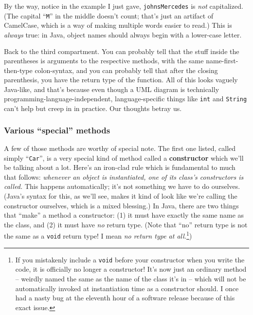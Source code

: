 By the way, notice in the example I just gave, \texttt{johnsMercedes} is
\textit{not} capitalized. (The capital ``\texttt{M}'' in the middle doesn't
count; that's just an artifact of CamelCase, which is a way of making multiple
words easier to read.) This is \textit{always} true: in Java, object names
should always begin with a lower-case letter.

Back to the third compartment. You can probably tell that the stuff inside the
parentheses is arguments to the respective methods, with the same
name-first-then-type colon-syntax, and you can probably tell that after the
closing parenthesis, you have the return type of the function. All of this
looks vaguely Java-like, and that's because even though a UML diagram is
technically programming-language-independent, language-specific things like
\texttt{int} and \texttt{String} can't help but creep in in practice. Our
thoughts betray us.

\subsubsection{Various ``special'' methods}
\label{page:instantiateConstructor}

A few of those methods are worthy of special note. The first one listed,
called simply ``\texttt{Car}'', is a very special kind of method called a
\textbf{constructor} which we'll be talking about a lot. Here's an iron-clad
rule which is fundamental to much that follows: \textit{whenever an object is
instantiated, one of its class's constructors is called.} This happens
automatically; it's not something we have to do ourselves. (Java's syntax for
this, as we'll see, makes it kind of look like we're calling the constructor
ourselves, which is a mixed blessing.) In Java, there are two things that
``make'' a method a constructor: (1) it must have exactly the same name as the
class, and (2) it must have \textit{no} return type. (Note that ``no'' return
type is not the same as a \texttt{void} return type! I mean \textit{no return
type at all.}\footnote{If you mistakenly include a \texttt{void} before your
constructor when you write the code, it is officially no longer a constructor!
It's now just an ordinary method -- weirdly named the same as the name of the
class it's in -- which will not be automatically invoked at instantiation time
as a constructor should. I once had a nasty bug at the eleventh hour of a
software release because of this exact issue.})

